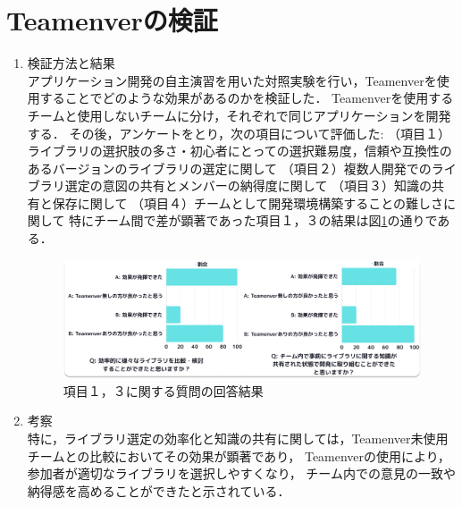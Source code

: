 \documentclass[main]{subfiles}
\begin{document}
\section{Teamenverの検証}
\begin{enumerate}
    \item 検証方法と結果\\
        アプリケーション開発の自主演習を用いた対照実験を行い，Teamenverを使用することでどのような効果があるのかを検証した．
        Teamenverを使用するチームと使用しないチームに分け，それぞれで同じアプリケーションを開発する．
        その後，アンケートをとり，次の項目について評価した: 
        （項目１）ライブラリの選択肢の多さ・初心者にとっての選択難易度，信頼や互換性のあるバージョンのライブラリの選定に関して
        （項目２）複数人開発でのライブラリ選定の意図の共有とメンバーの納得度に関して
        （項目３）知識の共有と保存に関して
        （項目４）チームとして開発環境構築することの難しさに関して
        特にチーム間で差が顕著であった項目１，３の結果は図\ref{fig:result}の通りである．
        
        \begin{figure}[h]
            \centering
            \includegraphics[keepaspectratio,width=1.1\linewidth]{../figures/result.pdf}
            \caption{項目１，３に関する質問の回答結果}
            \label{fig:result}
        \end{figure}
        
    \item 考察\\
            特に，ライブラリ選定の効率化と知識の共有に関しては，Teamenver未使用チームとの比較においてその効果が顕著であり，
        Teamenverの使用により，参加者が適切なライブラリを選択しやすくなり，
        チーム内での意見の一致や納得感を高めることができたと示されている．
\end{enumerate}
\end{document}
